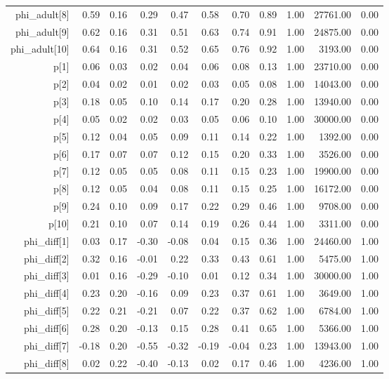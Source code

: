 \begin{table}[ht]
\begin{tabular}{rrrrrrrrrrr}
  phi\_adult[8] & 0.59 & 0.16 & 0.29 & 0.47 & 0.58 & 0.70 & 0.89 & 1.00 & 27761.00 & 0.00 \\ 
  phi\_adult[9] & 0.62 & 0.16 & 0.31 & 0.51 & 0.63 & 0.74 & 0.91 & 1.00 & 24875.00 & 0.00 \\ 
  phi\_adult[10] & 0.64 & 0.16 & 0.31 & 0.52 & 0.65 & 0.76 & 0.92 & 1.00 & 3193.00 & 0.00 \\ 
  p[1] & 0.06 & 0.03 & 0.02 & 0.04 & 0.06 & 0.08 & 0.13 & 1.00 & 23710.00 & 0.00 \\ 
  p[2] & 0.04 & 0.02 & 0.01 & 0.02 & 0.03 & 0.05 & 0.08 & 1.00 & 14043.00 & 0.00 \\ 
  p[3] & 0.18 & 0.05 & 0.10 & 0.14 & 0.17 & 0.20 & 0.28 & 1.00 & 13940.00 & 0.00 \\ 
  p[4] & 0.05 & 0.02 & 0.02 & 0.03 & 0.05 & 0.06 & 0.10 & 1.00 & 30000.00 & 0.00 \\ 
  p[5] & 0.12 & 0.04 & 0.05 & 0.09 & 0.11 & 0.14 & 0.22 & 1.00 & 1392.00 & 0.00 \\ 
  p[6] & 0.17 & 0.07 & 0.07 & 0.12 & 0.15 & 0.20 & 0.33 & 1.00 & 3526.00 & 0.00 \\ 
  p[7] & 0.12 & 0.05 & 0.05 & 0.08 & 0.11 & 0.15 & 0.23 & 1.00 & 19900.00 & 0.00 \\ 
  p[8] & 0.12 & 0.05 & 0.04 & 0.08 & 0.11 & 0.15 & 0.25 & 1.00 & 16172.00 & 0.00 \\ 
  p[9] & 0.24 & 0.10 & 0.09 & 0.17 & 0.22 & 0.29 & 0.46 & 1.00 & 9708.00 & 0.00 \\ 
  p[10] & 0.21 & 0.10 & 0.07 & 0.14 & 0.19 & 0.26 & 0.44 & 1.00 & 3311.00 & 0.00 \\ 
  phi\_diff[1] & 0.03 & 0.17 & -0.30 & -0.08 & 0.04 & 0.15 & 0.36 & 1.00 & 24460.00 & 1.00 \\ 
  phi\_diff[2] & 0.32 & 0.16 & -0.01 & 0.22 & 0.33 & 0.43 & 0.61 & 1.00 & 5475.00 & 1.00 \\ 
  phi\_diff[3] & 0.01 & 0.16 & -0.29 & -0.10 & 0.01 & 0.12 & 0.34 & 1.00 & 30000.00 & 1.00 \\ 
  phi\_diff[4] & 0.23 & 0.20 & -0.16 & 0.09 & 0.23 & 0.37 & 0.61 & 1.00 & 3649.00 & 1.00 \\ 
  phi\_diff[5] & 0.22 & 0.21 & -0.21 & 0.07 & 0.22 & 0.37 & 0.62 & 1.00 & 6784.00 & 1.00 \\ 
  phi\_diff[6] & 0.28 & 0.20 & -0.13 & 0.15 & 0.28 & 0.41 & 0.65 & 1.00 & 5366.00 & 1.00 \\ 
  phi\_diff[7] & -0.18 & 0.20 & -0.55 & -0.32 & -0.19 & -0.04 & 0.23 & 1.00 & 13943.00 & 1.00 \\ 
  phi\_diff[8] & 0.02 & 0.22 & -0.40 & -0.13 & 0.02 & 0.17 & 0.46 & 1.00 & 4236.00 & 1.00 \\ 

\end{tabular}
\end{table}
